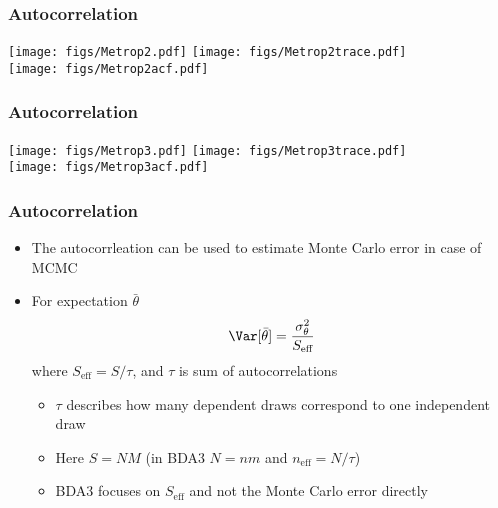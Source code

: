 \documentclass[10pt]{beamer}
\begin{document}
\begin{frame}

\frametitle{Autocorrelation}

  \vspace{-0.5\baselineskip}
  \texttt{[image: figs/Metrop2.pdf]}
  {\texttt{[image: figs/Metrop2trace.pdf]}\\}
  {\texttt{[image: figs/Metrop2acf.pdf]}}

\end{frame}

\begin{frame}

\frametitle{Autocorrelation}

  \vspace{-0.5\baselineskip}
  \texttt{[image: figs/Metrop3.pdf]}
  {\texttt{[image: figs/Metrop3trace.pdf]}\\}
  {\texttt{[image: figs/Metrop3acf.pdf]}}

\end{frame}

\begin{frame}

\frametitle{Autocorrelation}

  \begin{itemize}
  \item The autocorrleation can be used to estimate Monte Carlo error in case of MCMC
  \item For expectation $\bar{\theta}$
    \begin{equation*}
      \Var[\bar{\theta}] = \frac{\sigma^2_\theta}{S_\text{eff}}
    \end{equation*}
    where $S_\text{eff}=S/\tau$, and $\tau$ is sum of autocorrelations
    \begin{itemize}
      \item<2-> $\tau$ describes how many dependent draws correspond to one independent draw
      \item<3-> Here $S=NM$ (in BDA3 $N=nm$ and $n_\text{eff}=N/\tau$)
      \item<4-> BDA3 focuses on $S_\text{eff}$ and not the Monte Carlo error directly
    \end{itemize}
  \end{itemize}
\end{frame}
\end{document}
